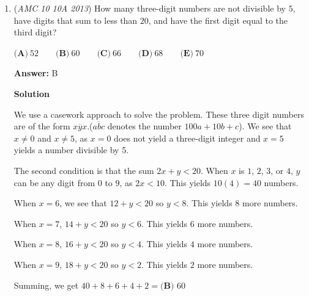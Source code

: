 \begin{enumerate}
 $2(7x/5 + 7/5(20-x))$
$2(7x/5 + 28 - 7x/5)$
$2(28)$
$56\implies \boxed{\textbf{(C)}}$




\textbf{Solution 4}

The problem implies that where you choose $D$, $E$, and $F$ are irrelevant. This means that to make it easier, choose it such that $D$, $E$, and $F$ are the midpoints of $\overline{AB}$, $\overline{BC}$, and $\overline{AC}$ respectively. $28 \div 2 = 14$, $14 \times 4 = 56$, so $\boxed{\textbf{(C)}}$. 

 



\textbf{Solution 5}

Drawing the diagram with a ruler and compass (and scaling back by x4), we can draw approximate parallel lines. This yields about 14, but we need to multiply by 4 to get 56, or $\boxed{(C)}$.

 


	\item (\textit{AMC 10 10A 2013}) How many three-digit numbers are not divisible by $5$, have digits that sum to less than $20$, and have the first digit equal to the third digit?


 $\textbf{(A)}\ 52 \qquad\textbf{(B)}\ 60  \qquad\textbf{(C)}\ 66 \qquad\textbf{(D)}\ 68 \qquad\textbf{(E)}\ 70$

 \textbf{Answer: }B



\textbf{Solution}

We use a casework approach to solve the problem. These three digit numbers are of the form $\overline{xyx}$.($\overline{abc}$ denotes the number $100a+10b+c$).  We see that $x\neq 0$ and $x\neq 5$, as $x=0$ does not yield a three-digit integer and $x=5$ yields a number divisible by 5.

 The second condition is that the sum $2x+y<20$.  When $x$ is $1$, $2$, $3$, or $4$, $y$ can be any digit from $0$ to $9$, as $2x<10$.  This yields $10(4) = 40$ numbers.  

 When $x=6$, we see that $12+y<20$ so $y<8$.  This yields $8$ more numbers.  

 When $x=7$,  $14+y<20$ so $y<6$.  This yields $6$ more numbers.  

 When $x=8$, $16+y<20$ so $y<4$.  This yields $4$ more numbers.  

 When $x=9$, $18+y<20$ so $y<2$.  This yields $2$ more numbers.  

 Summing, we get $40 + 8 + 6 + 4 + 2 = \boxed{\textbf{(B) }60}$




\end{enumerate}
